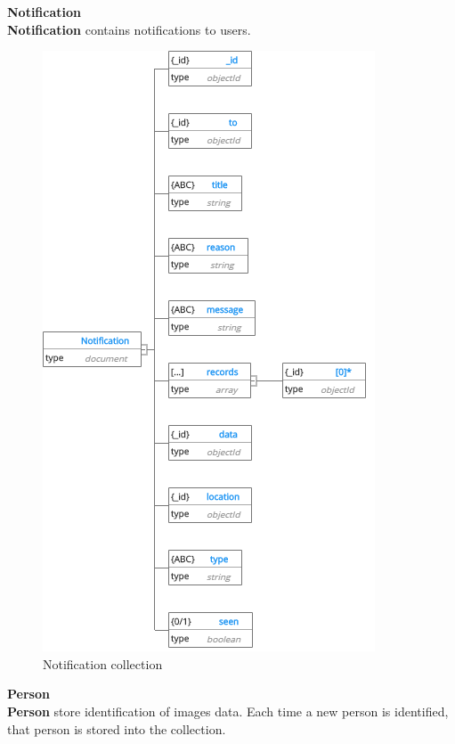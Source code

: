 \cleardoublepage
\textbf{Notification}\\
\textbf{Notification} contains notifications to users. 
\begin{center}
	\begin{figure}[H]
		\centering
		\includegraphics[width=0.6\columnwidth]{images/chap4/Notification.png}
		\caption{Notification collection}
	\end{figure}
\end{center}
\cleardoublepage
\textbf{Person}\\
\textbf{Person} store identification of images data. Each time a new person is identified, that person is stored into the collection.
